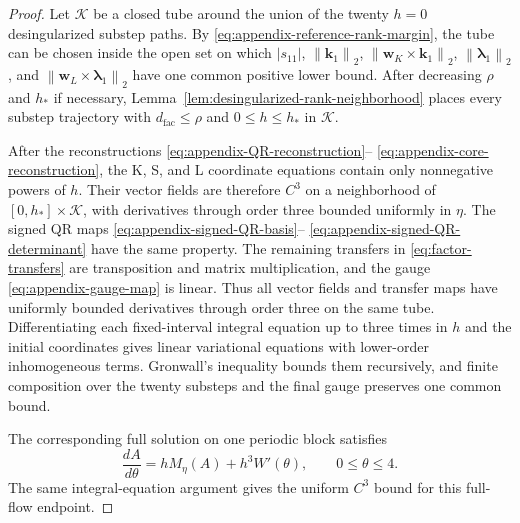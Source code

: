 \documentclass[10pt,a4paper]{amsart}
\numberwithin{equation}{section}
\newcommand{\norm}[1]{\left\lVert #1\right\rVert}
\begin{document}
\begin{proof}
Let $\mathcal K$ be a closed tube around the union of the twenty
$h=0$ desingularized substep paths.  By
\eqref{eq:appendix-reference-rank-margin}, the tube can be chosen inside
the open set on which $|s_{11}|$, $\norm{\boldsymbol k_1}_2$,
$\norm{\boldsymbol w_K\times\boldsymbol k_1}_2$,
$\norm{\boldsymbol\lambda_1}_2$, and
$\norm{\boldsymbol w_L\times\boldsymbol\lambda_1}_2$ have one common
positive lower bound.  After decreasing $\rho$ and $h_*$ if necessary,
Lemma~\ref{lem:desingularized-rank-neighborhood} places every substep
trajectory with $d_{\mathrm{fac}}\le\rho$ and $0\le h\le h_*$ in $\mathcal K$.

After the reconstructions \eqref{eq:appendix-QR-reconstruction}--
\eqref{eq:appendix-core-reconstruction}, the K, S, and L coordinate
equations contain only nonnegative powers of $h$.  Their vector fields
are therefore $C^3$ on a neighborhood of
$[0,h_*]\times\mathcal K$, with derivatives through order three bounded
uniformly in $\eta$.  The signed QR maps
\eqref{eq:appendix-signed-QR-basis}--
\eqref{eq:appendix-signed-QR-determinant} have the same property.  The
remaining transfers in \eqref{eq:factor-transfers} are transposition
and matrix multiplication, and the gauge
\eqref{eq:appendix-gauge-map} is linear.  Thus all vector fields and
transfer maps have uniformly bounded derivatives through order three
on the same tube.  Differentiating each fixed-interval integral
equation up to three times in $h$ and the initial coordinates gives
linear variational equations with lower-order inhomogeneous terms.
Gronwall's inequality bounds them recursively, and finite composition
over the twenty substeps and the final gauge preserves one common bound.

The corresponding full solution on one periodic block satisfies
\begin{equation}\label{eq:appendix-full-flow-parameter-equation}
 \frac{dA}{d\theta}=hM_\eta(A)+h^3W'(\theta),
 \qquad 0\le\theta\le4.
\end{equation}
The same integral-equation argument gives the uniform \(C^3\) bound for
this full-flow endpoint.


\end{proof}
\end{document}

